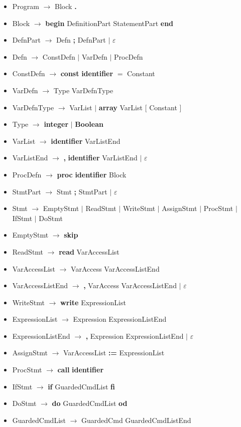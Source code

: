 \documentclass{article}
\let\bf\textbf
\newcommand{\der}{$\longrightarrow$ }
\newcommand{\es}{$\varepsilon$ }
\newcommand{\alt}{\Large$|$ \normalsize }
\begin{document}
    \begin{itemize}[label={}]
        \itemsep-0.3em
        \item Program \der Block \bf .
        \item Block \der \bf{begin} DefinitionPart StatementPart \bf{end}
        \item DefnPart \der Defn \bf ; DefnPart \alt \es
        \item Defn \der ConstDefn \alt VarDefn \alt ProcDefn
        \item ConstDefn \der \bf{const} \bf{identifier} $=$ Constant
        \item VarDefn \der Type VarDefnType
        \item VarDefnType \der VarList \alt \bf{array} VarList [ Constant ]
        \item Type \der \bf{integer} \alt \bf {Boolean}
        \item VarList \der \bf{identifier} VarListEnd
        \item VarListEnd \der \bf, \bf{identifier} VarListEnd \alt \es
        \item ProcDefn \der \bf{proc} \bf{identifier} Block
        \item StmtPart \der Stmt \bf ; StmtPart \alt \es
        \item Stmt \der EmptyStmt \alt ReadStmt \alt WriteStmt \alt AssignStmt \alt ProcStmt \alt IfStmt \alt DoStmt
        \item EmptyStmt \der \bf{skip}
        \item ReadStmt \der \bf{read} VarAccessList
        \item VarAccessList \der VarAccess VarAccessListEnd
        \item VarAccessListEnd \der \bf , VarAccess VarAccessListEnd \alt \es
        \item WriteStmt \der \bf{write} ExpressionList
        \item ExpressionList \der Expression ExpressionListEnd
        \item ExpressionListEnd \der \bf, Expression ExpressionListEnd \alt \es 
        \item AssignStmt \der VarAccessList \bf{:=} ExpressionList
        \item ProcStmt \der \bf{call} \bf{identifier}
        \item IfStmt \der \bf{if} GuardedCmdList \bf{fi}
        \item DoStmt \der \bf{do} GuardedCmdList \bf{od}
        \item GuardedCmdList \der GuardedCmd GuardedCmdListEnd

\end{itemize}
\end{document}
